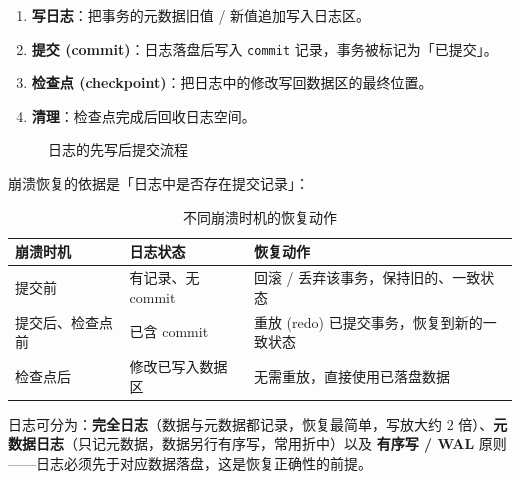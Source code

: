 \begin{enumerate}
    \item \textbf{写日志}：把事务的元数据旧值 / 新值追加写入日志区。
    \item \textbf{提交 (commit)}：日志落盘后写入 \texttt{commit} 记录，事务被标记为「已提交」。
    \item \textbf{检查点 (checkpoint)}：把日志中的修改写回数据区的最终位置。
    \item \textbf{清理}：检查点完成后回收日志空间。
\end{enumerate}

\begin{figure}[H]
\centering
{}
\caption{日志的先写后提交流程}
\end{figure}

崩溃恢复的依据是「日志中是否存在提交记录」：

\begin{table}[H]
\centering
\caption{不同崩溃时机的恢复动作}
\begin{tabulary}{\textwidth}{LLL}
\toprule
崩溃时机 & 日志状态 & 恢复动作 \\
\midrule
提交前 & 有记录、无 commit & 回滚 / 丢弃该事务，保持旧的、一致状态 \\
提交后、检查点前 & 已含 commit & 重放 (redo) 已提交事务，恢复到新的一致状态 \\
检查点后 & 修改已写入数据区 & 无需重放，直接使用已落盘数据 \\
\bottomrule
\end{tabulary}
\end{table}

日志可分为：\textbf{完全日志}（数据与元数据都记录，恢复最简单，写放大约 $2$ 倍）、\textbf{元数据日志}（只记元数据，数据另行有序写，常用折中）以及 \textbf{有序写 / WAL} 原则——日志必须先于对应数据落盘，这是恢复正确性的前提。
